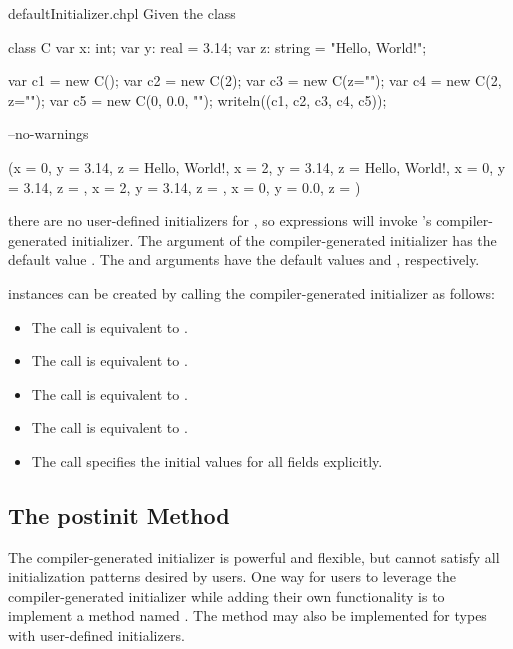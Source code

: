 \begin{chapelexample}{defaultInitializer.chpl}
Given the class
\begin{chapel}
class C {
  var x: int;
  var y: real = 3.14;
  var z: string = "Hello, World!";
}
\end{chapel}
\begin{chapelpost}
var c1 = new C();
var c2 = new C(2);
var c3 = new C(z="");
var c4 = new C(2, z="");
var c5 = new C(0, 0.0, "");
writeln((c1, c2, c3, c4, c5));
\end{chapelpost}
\begin{chapelcompopts}
--no-warnings
\end{chapelcompopts}
\begin{chapeloutput}
({x = 0, y = 3.14, z = Hello, World!}, {x = 2, y = 3.14, z = Hello, World!}, {x = 0, y = 3.14, z = }, {x = 2, y = 3.14, z = }, {x = 0, y = 0.0, z = })
\end{chapeloutput}
there are no user-defined initializers for , so  expressions
will invoke 's compiler-generated initializer. The  argument
of the compiler-generated initializer has the default value .
The  and  arguments have the default values  and
, respectively.

 instances can be created by calling the compiler-generated initializer as follows:
\begin{itemize}
\item The call  is equivalent to .
\item The call  is equivalent to .
\item The call  is equivalent to .
\item The call  is equivalent to .
\item The call  specifies the initial values for all fields explicitly.
\end{itemize}
\end{chapelexample}

\subsection{The postinit Method}
\label{The_postinit_Method}

The compiler-generated initializer is powerful and flexible, but cannot satisfy
all initialization patterns desired by users. One way for users to leverage
the compiler-generated initializer while adding their own functionality is to
implement a method named . The  method may also
be implemented for types with user-defined initializers.

